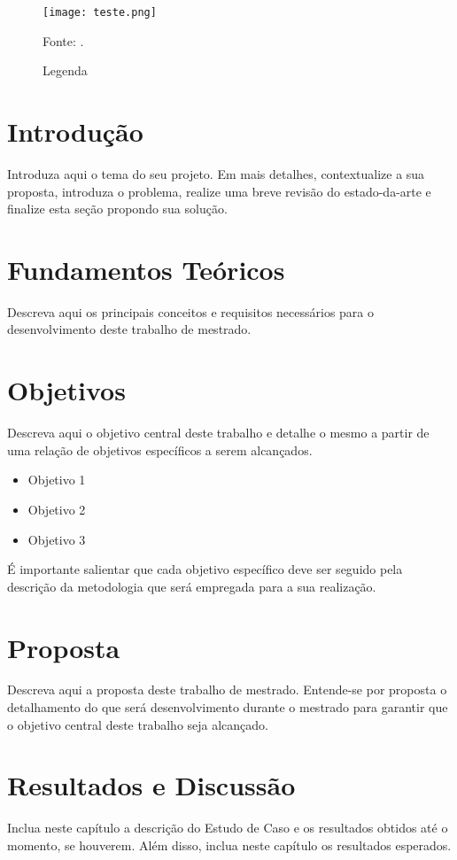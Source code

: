 \documentclass[article,11pt,oneside,a4paper,english,brazil,sumario=tradicional]{abntex2}
\begin{document}
\begin{figure}[h!] 
\centering %
\caption{Legenda}
\texttt{[image: teste.png]}

Fonte: \cite{Raichle2011}.
\label{f:ref-cruzada}
\end{figure}

\section{Introdução}
Introduza aqui o tema do seu projeto. Em mais detalhes, contextualize a sua proposta, introduza o problema, realize uma breve revisão do estado-da-arte e finalize esta seção propondo sua solução.



\section{Fundamentos Teóricos}
Descreva aqui os principais conceitos e requisitos necessários para o desenvolvimento deste trabalho de mestrado.

\section{Objetivos}
Descreva aqui o objetivo central deste trabalho e detalhe o mesmo a partir de uma relação de objetivos específicos a serem alcançados.
\begin{itemize}
    \item Objetivo 1
    \item Objetivo 2
    \item Objetivo 3
\end{itemize}

É importante salientar que cada objetivo específico deve ser seguido pela descrição da metodologia que será empregada para a sua realização.


\section{Proposta}
Descreva aqui a proposta deste trabalho de mestrado. Entende-se por proposta o detalhamento do que será desenvolvimento durante o mestrado para garantir que o objetivo central deste trabalho seja alcançado. 

\section{Resultados e Discussão}
Inclua neste capítulo a descrição do Estudo de Caso e os resultados obtidos até o momento, se houverem. Além disso, inclua neste capítulo os resultados esperados. 
\end{document}
